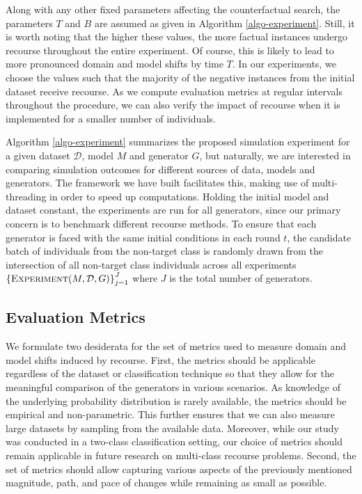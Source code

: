 \documentclass[conference,final,]{IEEEtran}
\theoremstyle{definition}
\theoremstyle{definition}
\theoremstyle{definition}
\theoremstyle{definition}
\theoremstyle{remark}
\begin{document}
Along with any other fixed parameters affecting the counterfactual search, the parameters \(T\) and \(B\) are assumed as given in Algorithm \ref{algo-experiment}. Still, it is worth noting that the higher these values, the more factual instances undergo recourse throughout the entire experiment. Of course, this is likely to lead to more pronounced domain and model shifts by time \(T\). In our experiments, we choose the values such that the majority of the negative instances from the initial dataset receive recourse. As we compute evaluation metrics at regular intervals throughout the procedure, we can also verify the impact of recourse when it is implemented for a smaller number of individuals.

Algorithm \ref{algo-experiment} summarizes the proposed simulation experiment for a given dataset \(\mathcal{D}\), model \(M\) and generator \(G\), but naturally, we are interested in comparing simulation outcomes for different sources of data, models and generators. The framework we have built facilitates this, making use of multi-threading in order to speed up computations. Holding the initial model and dataset constant, the experiments are run for all generators, since our primary concern is to benchmark different recourse methods. To ensure that each generator is faced with the same initial conditions in each round \(t\), the candidate batch of individuals from the non-target class is randomly drawn from the intersection of all non-target class individuals across all experiments \(\left\{\textsc{Experiment}(M,\mathcal{D},G)\right\}_{j=1}^J\) where \(J\) is the total number of generators.

\hypertarget{method-2-metrics}{%
\subsection{Evaluation Metrics}\label{method-2-metrics}}

We formulate two desiderata for the set of metrics used to measure domain and model shifts induced by recourse. First, the metrics should be applicable regardless of the dataset or classification technique so that they allow for the meaningful comparison of the generators in various scenarios. As knowledge of the underlying probability distribution is rarely available, the metrics should be empirical and non-parametric. This further ensures that we can also measure large datasets by sampling from the available data. Moreover, while our study was conducted in a two-class classification setting, our choice of metrics should remain applicable in future research on multi-class recourse problems. Second, the set of metrics should allow capturing various aspects of the previously mentioned magnitude, path, and pace of changes while remaining as small as possible.
\end{document}
